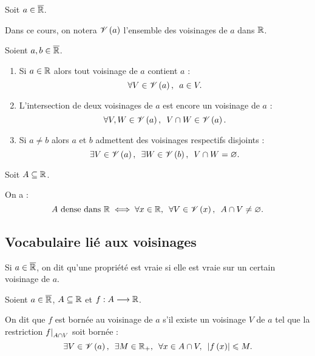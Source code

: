 \begin{nota}
Soit \(a\in\overline{\mathbb{R}}\).

Dans ce cours, on notera \(\mathscr{V}\left(a\right)\) l'ensemble des voisinages de \(a\) dans \(\mathbb{R}\).
\end{nota}

\begin{prop}
Soient \(a,b\in\overline{\mathbb{R}}\).

\begin{enumerate}
\item Si \(a\in\mathbb{R}\) alors tout voisinage de \(a\) contient \(a\) : \[\quantifs{\forall V\in\V{a}}a\in V.\]

\item L'intersection de deux voisinages de \(a\) est encore un voisinage de \(a\) : \[\quantifs{\forall V,W\in\V{a}}V\inter W\in\V{a}.\]

\item Si \(a\not=b\) alors \(a\) et \(b\) admettent des voisinages respectifs disjoints : \[\quantifs{\exists V\in\V{a};\exists W\in\V{b}}V\inter W=\ensvide.\]
\end{enumerate}
\end{prop}

\begin{dem}
\end{dem}

\begin{rem}
Soit \(A\subseteq\mathbb{R}\).

On a : \[A\text{ dense dans }\R\ssi\quantifs{\forall x\in\R;\forall V\in\V{x}}A\inter V\not=\ensvide.\]
\end{rem}

\subsection{Vocabulaire lié aux voisinages}

Si \(a\in\overline{\mathbb{R}}\), on dit qu'une propriété est vraie  si elle est vraie sur un certain voisinage de \(a\).

\begin{defi}
Soient \(a\in\overline{\mathbb{R}}\), \(A\subseteq\mathbb{R}\) et \(f:A\longrightarrow\mathbb{R}\).

On dit que \(f\) est bornée au voisinage de \(a\) s'il existe un voisinage \(V\) de \(a\) tel que la restriction \(\restr{f}{A\inter V}\) soit bornée : \[\quantifs{\exists V\in\V{a};\exists M\in\Rp;\forall x\in A\inter V}\abs{f\paren{x}}\leq M.\]
\end{defi}


